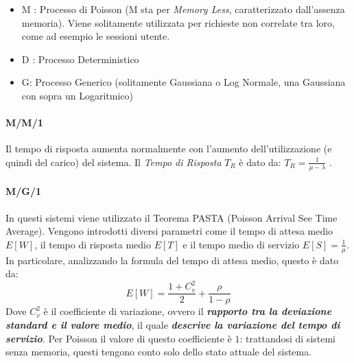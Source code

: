 \documentclass{article}
\providecommand{\tightlist}{%
		  \setlength{\itemsep}{0pt}\setlength{\parskip}{0pt}}
\begin{document}
		\begin{itemize}
			\tightlist
			\item
			M : Processo di Poisson (M sta per \emph{Memory
				Less}, caratterizzato dall'assenza memoria). Viene solitamente
			utilizzata per richieste non correlate tra loro, come
			ad esempio le sessioni utente.
			\item
			D : Processo Deterministico
			\item
			G: Processo Generico (solitamente Gaussiana o
			Log Normale, una Gaussiana con sopra un Logaritmico)
		\end{itemize}
		
	
		\paragraph{M/M/1}\label{mm1}
		Il tempo di risposta aumenta normalmente con l'aumento
		dell'utilizzazione (e quindi del carico) del sistema. Il \emph{Tempo di
			Risposta} \(T_R\) è dato da: \(T_R = \frac{1}{\mu-\lambda}\) .
		
		\paragraph{M/G/1}\label{mg1}
				
		In questi sistemi viene utilizzato il Teorema PASTA
		(Poisson Arrival See Time Average). Vengono introdotti diversi
		parametri come il tempo di attesa medio \(E[W]\), il
		tempo di risposta medio \(E[T]\) e il
		tempo medio di servizio \(E[S]=\frac{1}{\mu}\). In
		particolare, analizzando la formula del tempo di attesa medio, questo è
		dato da: \[
		E[W] = \frac{1+C_v^2}{2}+\frac{\rho}{1-\rho}
		\] Dove \(C_v^2\) è il coefficiente di variazione,
		ovvero il \textbf{\emph{rapporto tra la deviazione standard e il valore
				medio}}, il quale \textbf{\emph{descrive la variazione del tempo di
				servizio}}. Per Poisson il valore di questo coefficiente è \(1\):
		trattandosi di sistemi senza memoria, questi tengono conto solo dello
		stato attuale del sistema.
		
\end{document}
